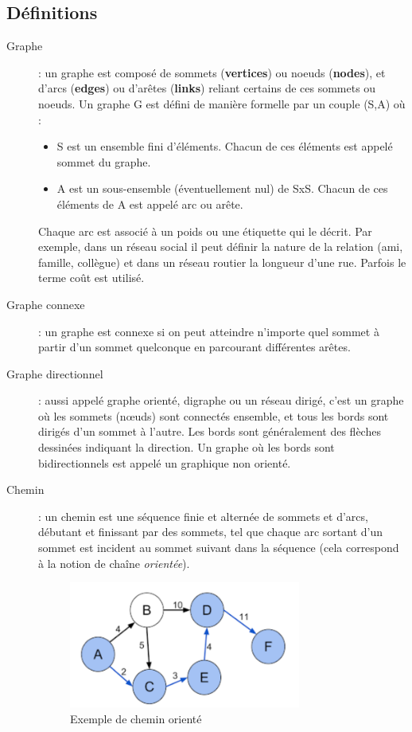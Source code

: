 \subsection{Définitions}
\begin{description}
\item[Graphe]: un graphe est composé de sommets (\textbf{vertices}) ou noeuds (\textbf{nodes}), et d'arcs (\textbf{edges}) ou d'arêtes (\textbf{links}) reliant certains de ces sommets ou noeuds.
Un graphe G est défini de manière formelle par un couple (S,A) où :
\begin{itemize}
	\item S est un ensemble fini d'éléments. Chacun de ces éléments est appelé sommet du graphe.
	\item A est un sous-ensemble (éventuellement nul) de SxS. Chacun de ces éléments de A est appelé arc ou arête.
\end{itemize}
Chaque arc est associé à un poids ou une étiquette qui le décrit. Par exemple, dans un réseau social il peut définir la nature de la relation (ami, famille, collègue) et dans un réseau routier la longueur d'une rue. Parfois le terme coût est utilisé.

\item[Graphe connexe] : un graphe est connexe si on peut atteindre n'importe quel sommet à partir d'un sommet quelconque en parcourant différentes arêtes.

\item[Graphe directionnel] : aussi appelé graphe orienté, digraphe ou un réseau dirigé, c'est un graphe où les sommets (nœuds) sont connectés ensemble, et tous les bords sont dirigés d'un sommet à l'autre. Les bords sont généralement des flèches dessinées indiquant la direction.
Un graphe où les bords sont bidirectionnels est appelé un graphique non orienté.

\item[Chemin] : un chemin est une séquence finie et alternée de sommets et d'arcs, débutant et finissant par des sommets, tel que chaque arc sortant d'un sommet est incident au sommet suivant dans la séquence (cela correspond à la notion de chaîne \emph{orientée}).
\begin{figure}[h]
	\centering
	\includegraphics[width=0.75\textwidth]{img/cheminGraphe.png}
	\caption{Exemple de chemin orienté}
\end{figure}
\end{description}

